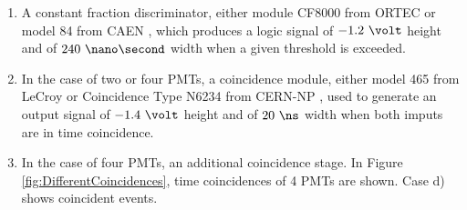 \begin{enumerate}

\item{}  A constant fraction discriminator, either module CF8000 from ORTEC \cite{DataSheetDiscriminator} or model 84 from CAEN \cite{DataSheetDiscriminatorCAEN}, which produces a logic signal of $-1.2~\volt$ height and of $240~\nano\second$ width when a given threshold is exceeded.

\item{} In the case of two or four PMTs, a coincidence module, either model 465 from LeCroy \cite{DataSheetCoincidenceLeCroy} or Coincidence Type N6234 from CERN-NP \cite{DataSheetCoincidenceCERN}, used to generate an output signal of $-1.4~\volt$ height and of $20~\ns$ width when both imputs are in time coincidence. 

\item{} In the case of four PMTs, an additional coincidence stage. In Figure \ref{fig:DifferentCoincidences}, time coincidences of 4 PMTs are shown. Case d) shows coincident events.






\end{enumerate}
